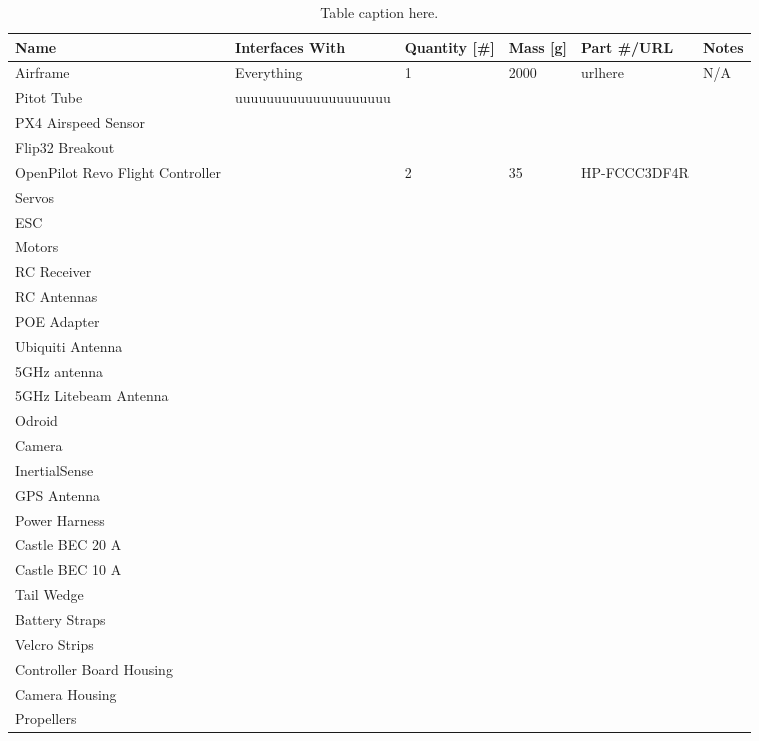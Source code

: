 \documentclass[]{auvsi_doc}
\begin{document}
\begin{table}[h!]
	\begin{center}
		\caption{Table caption here.}
		\label{table:BOM}
		\begin{tabularx}{\textwidth}{l l l l l l}
			\toprule
			Name & Interfaces With & Quantity [\#] & Mass [g] & Part \#/URL & Notes \\
			\midrule
			Airframe & Everything & 1 & 2000 & urlhere & N/A \\
			Pitot Tube &   uuuuuuuuuuuuuuuuuuuu &   &   &   &   \\
			PX4 Airspeed Sensor  &   &   &   &   &   \\
			Flip32 Breakout  &   &   &   &   &   \\
			OpenPilot Revo Flight Controller  &  & 2 & 35 & HP-FCCC3DF4R &   \\
			Servos  &   &   &   &   &   \\ 
			ESC  &   &   &   &   &   \\
			Motors  &   &   &   &   &   \\ 
			RC Receiver  &   &   &   &   &   \\
			RC Antennas  &   &   &   &   &   \\
			POE Adapter  &   &   &   &   &   \\
			Ubiquiti Antenna  &   &   &   &   &   \\ 
			5GHz antenna  &   &   &   &   &   \\
			5GHz Litebeam Antenna  &   &   &   &   &   \\
			Odroid  &   &   &   &   &   \\
			Camera  &   &   &   &   &   \\
			InertialSense  &   &   &   &   &   \\
			GPS Antenna  &   &   &   &   &   \\ 
			Power Harness  &   &   &   &   &   \\
			Castle BEC 20 A  &   &   &   &   &   \\
			Castle BEC 10 A  &   &   &   &   &   \\
			Tail Wedge  &   &   &   &   &   \\ 
			Battery Straps  &   &   &   &   &   \\
			Velcro Strips  &   &   &   &   &   \\
			Controller Board Housing  &   &   &   &   &   \\
			Camera Housing  &   &   &   &   &   \\
			Propellers  &   &   &   &   &   \\

\end{tabularx}
\end{center}
\end{table}
\end{document}
